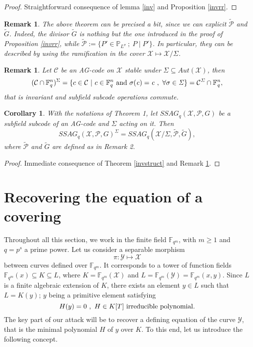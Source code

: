 \documentclass[10pt]{article}
\newtheorem{coro1}[thm]{Corollary}
\newtheorem{rq1}[thm]{Remark}
\newcommand{\s}{\vspace{0.3cm}}
\newcommand{\PP}{\mathbb{P}}
\newcommand{\fqm}{\mathbb{F}_{q^m}}
\newcommand{\fq}{\mathbb{F}_q}
\newcommand{\su}{\subseteq}
\newcommand{\X}{\mathcal{X}}
\newcommand{\Y}{\mathcal{Y}}
\newcommand{\PR}{\mathcal{P}}
\begin{document}
\s
 
\begin{proof}
Straightforward consequence of lemma \ref{inv} and Proposition \ref{invrr}.
\end{proof}

\s


\begin{rq1} \rm
The above theorem can be precised a bit, since we can explicit $\tilde{\PR}$ and $\tilde{G}$. Indeed, the divisor $\tilde{G}$ is nothing but the one introduced in the proof of Proposition \ref{invrr}, while $\tilde{\PR} := \{P' \in \PP_{L^{\sigma}} \ ; \ P \mid P'\}$. In particular, they can be described by using the ramification in the cover $\X \longmapsto \X/\Sigma$.
\end{rq1}

\s

\begin{rq1} \rm \label{commute}
Let $\mathcal{C}$ be an AG-code on $\X$ stable under $\Sigma \su Aut(\X)$, then
\[(\mathcal{C}\cap \fq^n)^{\Sigma} = \{c \in \mathcal{C} \ | \ c \in \fq^n \ \rm and \it \ \sigma(c)=c \ , \ \forall \sigma \in \Sigma\} = \mathcal{C}^{\Sigma} \cap \fq^n,\]
that is invariant and subfield subcode operations commute.
\end{rq1}

\s

\begin{coro1} \label{ssag}
With the notations of Theorem 1, let $SSAG_q(\X,\PR,G)$ be a subfield subcode of an AG-code and $\Sigma$ acting on it. Then 
\[SSAG_q(\X,\PR,G)^{\Sigma} = SSAG_q(\X/\Sigma,\tilde{\PR},\tilde{G}),\]
where $\tilde{\PR}$ and $\tilde{G}$ are defined as in Remark \rm 2.
\end{coro1}

\s

\begin{proof}
Immediate consequence of Theorem \ref{invstruct} and Remark \ref{commute}.
\end{proof}

\s

\section{Recovering the equation of a covering}


\s

Throughout all this section, we work in the finite field $\fqm$, with $m\geq 1$ and $q=p^s$ a prime power. Let us consider a separable morphism 
\[\pi : \Y \longmapsto \X\]
between curves defined over $\fqm$. It corresponds to a tower of function fields $\fqm(x) \su K \su L$, where $K=\fqm(\X)$ and $L=\fqm(\Y)=\fqm(x,y)$. Since $L$ is a finite  algebraic extension of $K$, there exists an element $y \in L$ such that $L=K(y)$; $y$ being a primitive element satisfying
\[ H(y)=0 \ , \ H \in K[T] \ \rm irreducible \ polynomial.\]
The key part of our attack will be to recover a defining equation of the curve $\Y$, that is the minimal polynomial $H$ of $y$ over $K$. To this end, let us introduce the following concept.
\end{document}
